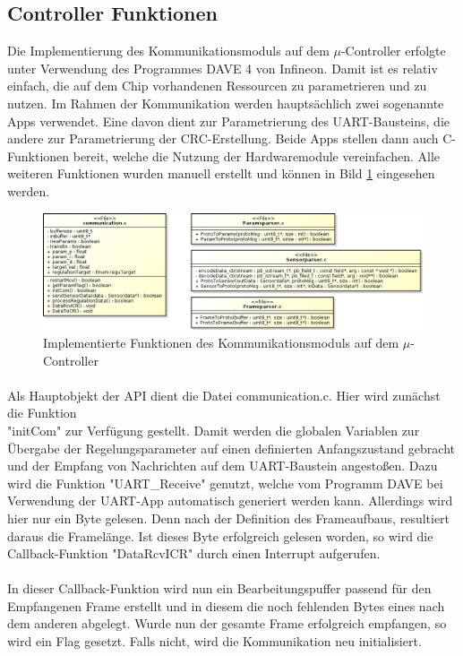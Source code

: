 \subsection{Controller Funktionen}
Die Implementierung des Kommunikationsmoduls auf dem $\mu$-Controller erfolgte unter Verwendung des Programmes DAVE 4 von Infineon. Damit ist es relativ einfach, die auf dem Chip vorhandenen Ressourcen zu parametrieren und zu nutzen. Im Rahmen der Kommunikation werden hauptsächlich zwei sogenannte Apps verwendet. Eine davon dient zur Parametrierung des UART-Bausteins, die andere zur Parametrierung der CRC-Erstellung. Beide Apps stellen dann auch C-Funktionen bereit, welche die Nutzung der Hardwaremodule vereinfachen. Alle weiteren Funktionen wurden manuell erstellt und können in Bild \ref{fig:xmcobj} eingesehen werden.
\begin{figure}
  \includegraphics[width=\textwidth]{XMCObjects}
  \caption{Implementierte Funktionen des Kommunikationsmoduls auf dem $\mu$-Controller}
  \label{fig:xmcobj}
\end{figure}
\paragraph{}
Als Hauptobjekt der API dient die Datei communication.c. Hier wird zunächst die Funktion \\"initCom" zur Verfügung gestellt. Damit werden die globalen Variablen zur Übergabe der Regelungsparameter auf einen definierten Anfangszustand gebracht und der Empfang von Nachrichten auf dem UART-Baustein angestoßen. Dazu wird die Funktion "UART\_Receive" genutzt, welche vom Programm DAVE bei Verwendung der UART-App automatisch generiert werden kann. Allerdings wird hier nur ein Byte gelesen. Denn nach der Definition des Frameaufbaus, resultiert daraus die Framelänge. Ist dieses Byte erfolgreich gelesen worden, so wird die Callback-Funktion "DataRcvICR" durch einen Interrupt aufgerufen.
\paragraph{}
In dieser Callback-Funktion wird nun ein Bearbeitungspuffer passend für den Empfangenen Frame erstellt und in diesem die noch fehlenden Bytes eines nach dem anderen abgelegt. Wurde nun der gesamte Frame erfolgreich empfangen, so wird ein Flag gesetzt. Falls nicht, wird die Kommunikation neu initialisiert.
